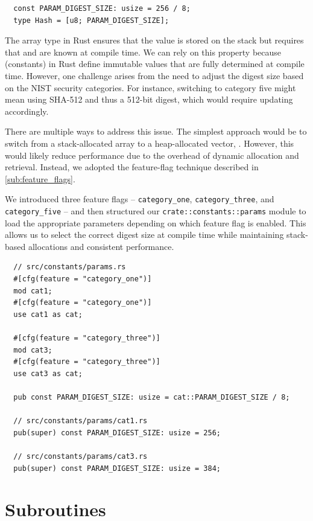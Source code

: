 \documentclass[11pt]{report}
\theoremstyle{definition}
\theoremstyle{plain}
\begin{document}
\begin{verbatim}
  const PARAM_DIGEST_SIZE: usize = 256 / 8;
  type Hash = [u8; PARAM_DIGEST_SIZE];
\end{verbatim}

The \rust{[T; N]} array type in Rust ensures that the value is stored on the stack but requires that  and  are known at compile time. We can rely on this property because  (constants) in Rust define immutable values that are fully determined at compile time. However, one challenge arises from the need to adjust the digest size based on the NIST security categories. For instance, switching to category five might mean using SHA-512 and thus a 512-bit digest, which would require updating  accordingly.

There are multiple ways to address this issue. The simplest approach would be to switch from a stack-allocated array to a heap-allocated vector, . However, this would likely reduce performance due to the overhead of dynamic allocation and retrieval. Instead, we adopted the feature-flag technique described in \autoref{sub:feature_flags}.

We introduced three feature flags -- \texttt{category\_one}, \texttt{category\_three}, and \texttt{category\_five} -- and then structured our \texttt{crate::constants::params} module to load the appropriate parameters depending on which feature flag is enabled. This allows us to select the correct digest size at compile time while maintaining stack-based allocations and consistent performance.

\begin{verbatim}
  // src/constants/params.rs
  #[cfg(feature = "category_one")]
  mod cat1;
  #[cfg(feature = "category_one")]
  use cat1 as cat;

  #[cfg(feature = "category_three")]
  mod cat3;
  #[cfg(feature = "category_three")]
  use cat3 as cat;

  pub const PARAM_DIGEST_SIZE: usize = cat::PARAM_DIGEST_SIZE / 8;

  // src/constants/params/cat1.rs
  pub(super) const PARAM_DIGEST_SIZE: usize = 256;

  // src/constants/params/cat3.rs
  pub(super) const PARAM_DIGEST_SIZE: usize = 384;
\end{verbatim}

\section{Subroutines}\label{sub:subroutines}
\end{document}
